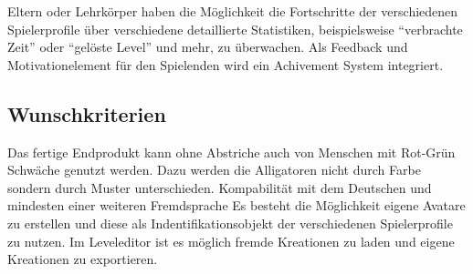 \begin{requirements}
	Eltern oder Lehrkörper haben die Möglichkeit die Fortschritte der verschiedenen Spielerprofile über verschiedene detaillierte Statistiken, beispielsweise ``verbrachte Zeit'' oder ``gelöste Level'' und mehr,  zu überwachen.
	Als Feedback und Motivationelement für den Spielenden wird ein Achivement System integriert.
\end{requirements}

\subsection{Wunschkriterien}

\begin{requirements}
	Das fertige Endprodukt kann ohne Abstriche auch von Menschen mit Rot-Grün Schwäche genutzt werden. Dazu werden die Alligatoren nicht durch Farbe sondern durch Muster unterschieden.
	Kompabilität mit dem Deutschen und mindesten einer weiteren Fremdsprache
	Es besteht die Möglichkeit eigene Avatare zu erstellen und diese als Indentifikationsobjekt der verschiedenen Spielerprofile zu nutzen.
	Im Leveleditor ist es möglich fremde Kreationen zu laden und eigene Kreationen zu exportieren.
\end{requirements}
